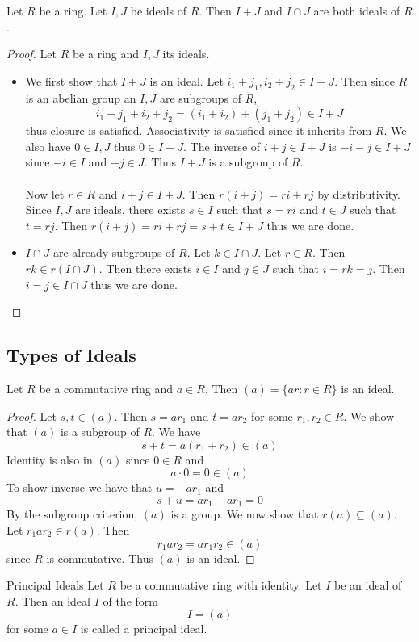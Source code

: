 \documentclass[a4paper]{article}
\begin{document}
\begin{prp}{}{} Let $R$ be a ring. Let $I,J$ be ideals of $R$. Then $I+J$ and $I\cap J$ are both ideals of $R$. \tcbline
\begin{proof}
Let $R$ be a ring and $I,J$ its ideals. 
\begin{itemize}
\item We first show that $I+J$ is an ideal. Let $i_1+j_1,i_2+j_2\in I+J$. Then since $R$ is an abelian group an $I,J$ are subgroups of $R$, $$i_1+j_1+i_2+j_2=(i_1+i_2)+(j_1+j_2)\in I+J$$ thus closure is satisfied. Associativity is satisfied since it inherits from $R$. We also have $0\in I,J$ thus $0\in I+J$. The inverse of $i+j\in I+J$ is $-i-j\in I+J$ since $-i\in I$ and $-j\in J$. Thus $I+J$ is a subgroup of $R$. \\~\\
Now let $r\in R$ and $i+j\in I+J$. Then $r(i+j)=ri+rj$ by distributivity. Since $I,J$ are ideals, there exists $s\in I$ such that $s=ri$ and $t\in J$ such that $t=rj$. Then $r(i+j)=ri+rj=s+t\in I+J$ thus we are done. 
\item $I\cap J$ are already subgroups of $R$. Let $k\in I\cap J$. Let $r\in R$. Then $rk\in r(I\cap J)$. Then there exists $i\in I$ and $j\in J$ such that $i=rk=j$. Then $i=j\in I\cap J$ thus we are done. 
\end{itemize}
\end{proof}
\end{prp}

\subsection{Types of Ideals}
\begin{lmm}{}{} Let $R$ be a commutative ring and $a\in R$. Then $(a)=\{ar:r\in R\}$ is an ideal. \tcbline
\begin{proof}
Let $s,t\in(a)$. Then $s=ar_1$ and $t=ar_2$ for some $r_1,r_2\in R$. We show that $(a)$ is a subgroup of $R$. We have $$s+t=a(r_1+r_2)\in(a)$$ Identity is also in $(a)$ since $0\in R$ and $$a\cdot 0=0\in(a)$$ To show inverse we have that $u=-ar_1$ and $$s+u=ar_1-ar_1=0$$ By the subgroup criterion, $(a)$ is a group. We now show that $r(a)\subseteq(a)$. Let $r_1ar_2\in r(a)$. Then $$r_1ar_2=ar_1r_2\in(a)$$ since $R$ is commutative. Thus $(a)$ is an ideal. 
\end{proof}
\end{lmm}

\begin{defn}{Principal Ideals}{} Let $R$ be a commutative ring with identity. Let $I$ be an ideal of $R$. Then an ideal $I$ of the form $$I=(a)$$ for some $a\in I$ is called a principal ideal. 
\end{defn}
\end{document}
